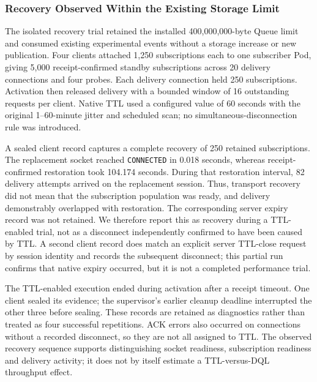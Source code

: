 \subsubsection{Recovery Observed Within the Existing Storage Limit}

The isolated recovery trial retained the installed 400,000,000-byte Queue
limit and consumed existing experimental events without a storage increase
or new publication. Four clients attached 1,250 subscriptions each to one
subscriber Pod, giving 5,000 receipt-confirmed standby subscriptions across
20 delivery connections and four probes. Each delivery connection held 250
subscriptions. Activation then released delivery with a bounded window of
16 outstanding requests per client. Native TTL used a configured value of
60 seconds with the original 1--60-minute jitter and scheduled scan; no
simultaneous-disconnection rule was introduced.

A sealed client record captures a complete recovery of 250 retained
subscriptions. The replacement socket reached \texttt{CONNECTED} in
0.018 seconds, whereas receipt-confirmed restoration took 104.174 seconds.
During that restoration interval, 82 delivery attempts arrived on the
replacement session. Thus, transport recovery did not mean that the
subscription population was ready, and delivery demonstrably overlapped
with restoration. The corresponding server expiry record was not retained. We therefore report
this as recovery during a TTL-enabled trial, not as a disconnect independently
confirmed to have been caused by TTL. A second client record does match an
explicit server TTL-close request by session identity and records the
subsequent disconnect; this partial run confirms that native expiry occurred, but it is not a
completed performance trial.

The TTL-enabled execution ended during activation after a receipt timeout.
One client sealed its evidence; the supervisor's earlier cleanup deadline
interrupted the other three before sealing. These records are retained as
diagnostics rather than treated as four successful repetitions. ACK errors
also occurred on connections without a recorded disconnect, so they are not
all assigned to TTL. The observed recovery sequence supports distinguishing
socket readiness, subscription readiness and delivery activity; it does not
by itself estimate a TTL-versus-DQL throughput effect.

